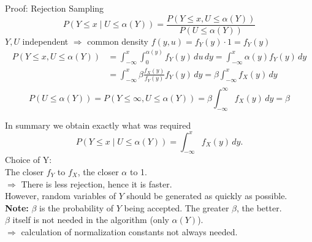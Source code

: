 \begin{vbframe}{Proof: Rejection Sampling}
$$ P(Y\le x \mid U\le \alpha(Y)) = \frac{P(Y\le x, U\le \alpha(Y))}{P(U\le\alpha(Y))}
$$
$Y, U$ independent $\Rightarrow$ common density $f(y,u)=f_Y(y)\cdot 1=f_Y(y)$
\begin{align*}
P(Y\le x, U\le\alpha(Y)) &= \int_{-\infty}^{x}\int_{0}^{\alpha(y)}f_Y(y)\,du\,dy
=\int_{-\infty}^{x}\alpha(y) f_Y(y)\,dy\\
&=\int_{-\infty}^{x}\beta\frac{f_X(y)}{f_Y(y)} f_Y(y)\,dy
=\beta\int_{-\infty}^{x}f_X(y)\,dy\\
\end{align*}
$$P(U\le\alpha(Y)) = P(Y\le\infty,U\le\alpha(Y))
                 = \beta\int_{-\infty}^{\infty}f_X(y)\,dy=\beta
$$

\framebreak

In summary we obtain exactly what was required
$$
P(Y\le x \mid U\le \alpha(Y)) = \int_{-\infty}^{x}f_X(y)\,dy.
$$
Choice of Y:\\
The closer $f_Y$ to $f_X$, the closer $\alpha$ to 1.\\
$\Rightarrow$ There is less rejection, hence it is faster.\\
\medskip
However, random variables of $Y$ should be generated as quickly as possible.\\
\medskip
\textbf{Note:} $\beta$ is the probability of $Y$ being accepted. The greater $\beta$, the better.\\
\medskip
$\beta$ itself is not needed in the algorithm (only $\alpha(Y)$).\\ $\Rightarrow$ calculation of normalization constants not always needed.
\end{vbframe}



